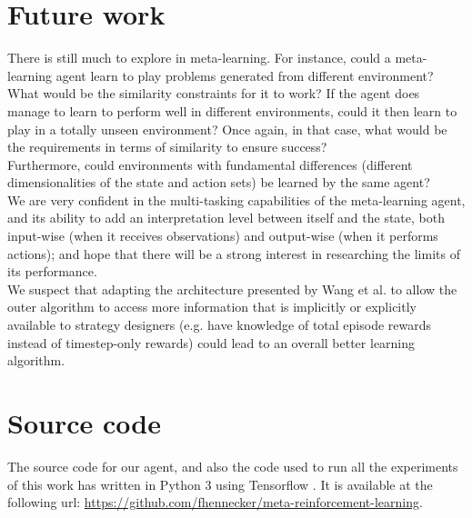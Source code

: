 \section{Future work}
There is still much to explore in meta-learning. For instance, could a 
meta-learning agent learn to play problems generated from different environment?
What would be the similarity constraints for it to work? If the agent does
manage to learn to perform well in different environments, could it then
learn to play in a totally unseen environment? Once again, in that case,
what would be the requirements in terms of similarity to ensure success?\\

Furthermore, could environments with fundamental differences (different 
dimensionalities of the state and action sets) be learned by the same agent?\\

We are very confident in the multi-tasking capabilities of the meta-learning
agent, and its ability to add an interpretation level between itself and the 
state, both input-wise (when it receives observations) and output-wise (when
it performs actions); and hope that there will be a strong interest in 
researching the limits of its performance.\\

We suspect that adapting the architecture presented by Wang et al. to allow
the outer algorithm to access more information that is implicitly or
explicitly available to strategy designers (e.g. have knowledge of total 
episode rewards instead of timestep-only rewards) could lead to an overall 
better learning algorithm.\\


\section{Source code}
The source code for our agent, and also the code used to run all the
experiments of this work has written in Python 3 \cite{python3} using
Tensorflow \cite{tensorflow}. It is available at the following url:
\url{https://github.com/fhennecker/meta-reinforcement-learning}.
